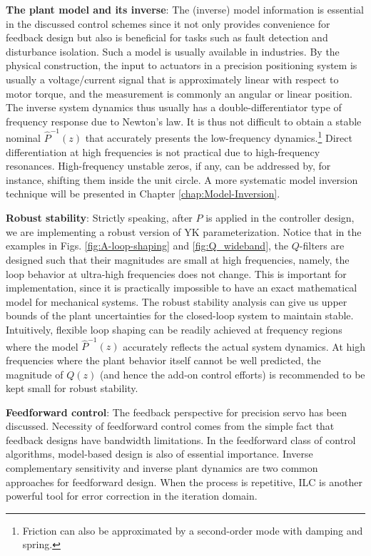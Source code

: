 \documentclass [11pt, proquest] {uwthesis}[2020/02/24]
\begin{document}
\textbf{The plant model and its inverse}: The
(inverse) model information is essential in the discussed control
schemes since it not only provides convenience for feedback design
but also is beneficial for tasks such as fault detection and disturbance
isolation. Such a model is usually available in industries. By the
physical construction, the input to actuators in a precision positioning
system is usually a voltage/current signal that is approximately linear
with respect to motor torque, and the measurement is commonly an angular
or linear position. The inverse system dynamics thus usually has a
double-differentiator type of frequency response due to Newton's law.
It is thus not difficult to obtain a stable nominal $\hat{P}^{-1}(z)$
that accurately presents the low-frequency dynamics.\footnote{Friction can also be approximated by a second-order mode with damping
and spring.} Direct differentiation at high frequencies is not practical due to
high-frequency resonances. High-frequency unstable zeros, if any,
can be addressed by, for instance, shifting them inside the unit circle. A more systematic model inversion technique will be presented in Chapter \ref{chap:Model-Inversion}.

\textbf{Robust stability}: Strictly speaking, after $\hat{P}$
is applied in the controller design, we are implementing a robust
version of YK parameterization. Notice that in the examples in Figs.
\ref{fig:A-loop-shaping} and \ref{fig:Q_wideband}, the $Q$-filters
are designed such that their magnitudes are small at high frequencies,
namely, the loop behavior at ultra-high frequencies does not change.
This is important for implementation, since it is practically impossible
to have an exact mathematical model for mechanical systems. The robust
stability analysis can give us upper bounds of the plant uncertainties
for the closed-loop system to maintain stable. Intuitively, flexible
loop shaping can be readily achieved at frequency regions where the
model $\hat{P}^{-1}(z)$ accurately reflects the actual system dynamics.
At high frequencies where the plant behavior itself cannot be well
predicted, the magnitude of $Q(z)$ (and hence the add-on control
efforts) is recommended to be kept small for robust stability. 

\textbf{Feedforward control}: The feedback perspective for precision
servo has been discussed. Necessity
of feedforward control comes from the simple fact that feedback designs have
bandwidth limitations. In the feedforward class of control algorithms, model-based
design is also of essential importance. Inverse complementary sensitivity
and inverse plant dynamics are two common approaches for feedforward design.
When the process is repetitive, ILC is
another powerful tool for error correction in the iteration domain.
\end{document}

